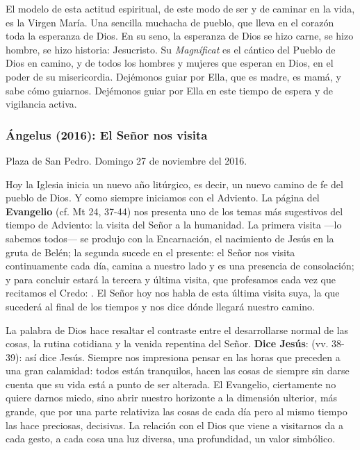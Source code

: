 \begin{body}
El modelo de esta actitud espiritual, de este modo de ser y de caminar en la vida, es la Virgen María. Una sencilla muchacha de pueblo, que lleva en el corazón toda la esperanza de Dios. En su seno, la esperanza de Dios se hizo carne, se hizo hombre, se hizo historia: Jesucristo. Su \emph{Magníficat} es el cántico del Pueblo de Dios en camino, y de todos los hombres y mujeres que esperan en Dios, en el poder de su misericordia. Dejémonos guiar por Ella, que es madre, es mamá, y sabe cómo guiarnos. Dejémonos guiar por Ella en este tiempo de espera y de vigilancia activa.

\subsubsection{Ángelus (2016): El Señor nos visita}

Plaza de San Pedro. Domingo 27 de noviembre del 2016.

Hoy la Iglesia inicia un nuevo año litúrgico, es decir, un nuevo camino de fe del pueblo de Dios. Y como siempre iniciamos con el Adviento. La página del \textbf{Evangelio} (cf. Mt 24, 37-44) nos presenta uno de los temas más sugestivos del tiempo de Adviento: la visita del Señor a la humanidad. La primera visita ---lo sabemos todos--- se produjo con la Encarnación, el nacimiento de Jesús en la gruta de Belén; la segunda sucede en el presente: el Señor nos visita continuamente cada día, camina a nuestro lado y es una presencia de consolación; y para concluir estará la tercera y última visita, que profesamos cada vez que recitamos el Credo: . El Señor hoy nos habla de esta última visita suya, la que sucederá al final de los tiempos y nos dice dónde llegará nuestro camino.

La palabra de Dios hace resaltar el contraste entre el desarrollarse normal de las cosas, la rutina cotidiana y la venida repentina del Señor. \textbf{Dice Jesús}:  (vv. 38-39): así dice Jesús. Siempre nos impresiona pensar en las horas que preceden a una gran calamidad: todos están tranquilos, hacen las cosas de siempre sin darse cuenta que su vida está a punto de ser alterada. El Evangelio, ciertamente no quiere darnos miedo, sino abrir nuestro horizonte a la dimensión ulterior, más grande, que por una parte relativiza las cosas de cada día pero al mismo tiempo las hace preciosas, decisivas. La relación con el Dios que viene a visitarnos da a cada gesto, a cada cosa una luz diversa, una profundidad, un valor simbólico.


\end{body}
